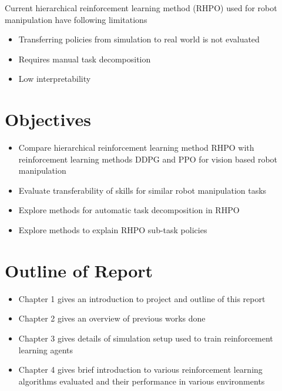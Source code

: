 \noindent Current hierarchical reinforcement learning method (RHPO) used for robot manipulation have following limitations
\begin{itemize}
	\item Transferring policies from simulation to real world is not evaluated
	\item Requires manual task decomposition
	\item Low interpretability
\end{itemize}

\section{Objectives}
\begin{itemize}
	\item Compare hierarchical reinforcement learning method RHPO with reinforcement learning methods DDPG and PPO for vision based robot manipulation
	\item Evaluate transferability of skills for similar robot manipulation tasks
	\item Explore methods for automatic task decomposition in RHPO
	\item Explore methods to explain RHPO sub-task policies
\end{itemize}

\section{Outline of Report}
\begin{itemize}
	\item Chapter 1 gives an introduction to project and outline of this report
	\item Chapter 2 gives an overview of previous works done
	\item Chapter 3 gives details of simulation setup used to train reinforcement learning agents
	\item Chapter 4 gives brief introduction to various reinforcement learning algorithms evaluated and their performance in various environments
\end{itemize}